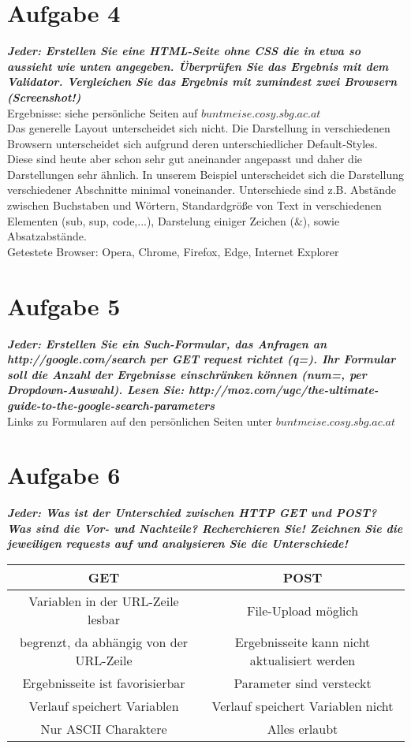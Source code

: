 \documentclass[12pt, a4paper]{report}
\begin{document}
\section*{Aufgabe 4}
\textbf{\textit{Jeder: Erstellen Sie eine HTML-Seite ohne CSS die in etwa so aussieht wie unten angegeben.
Überprüfen Sie das Ergebnis mit dem Validator. Vergleichen Sie das Ergebnis
mit zumindest zwei Browsern (Screenshot!)}}\\
Ergebnisse: siehe persönliche Seiten auf $buntmeise.cosy.sbg.ac.at$\\
Das generelle Layout unterscheidet sich nicht. Die Darstellung in verschiedenen Browsern unterscheidet sich aufgrund deren
unterschiedlicher Default-Styles. Diese sind heute aber schon sehr gut aneinander angepasst und daher die Darstellungen sehr ähnlich. In unserem Beispiel unterscheidet sich die Darstellung verschiedener Abschnitte minimal voneinander. Unterschiede sind z.B. Abstände zwischen Buchstaben und Wörtern, Standardgröße von Text in verschiedenen Elementen (sub, sup, code,...), Darstelung einiger Zeichen (\&), sowie Absatzabstände.\\
Getestete Browser: Opera, Chrome, Firefox, Edge, Internet Explorer



\section*{Aufgabe 5}
\textbf{\textit{Jeder: Erstellen Sie ein Such-Formular, das Anfragen an http://google.com/search
per GET request richtet (q=). Ihr Formular soll die Anzahl der Ergebnisse einschränken
können (num=, per Dropdown-Auswahl).
Lesen Sie: http://moz.com/ugc/the-ultimate-guide-to-the-google-search-parameters}}\\
Links zu Formularen auf den persönlichen Seiten unter $buntmeise.cosy.sbg.ac.at$

\section*{Aufgabe 6}
\textbf{\textit{Jeder: Was ist der Unterschied zwischen HTTP GET und POST? Was sind die Vor- und
Nachteile? Recherchieren Sie! Zeichnen Sie die jeweiligen requests auf und analysieren
Sie die Unterschiede!}}\\
\begin{tabular}{c|c}
	GET & POST \\ \hline
	Variablen in der URL-Zeile lesbar & File-Upload möglich \\ \hline
	begrenzt, da abhängig von der URL-Zeile & Ergebnisseite kann nicht aktualisiert werden\\ \hline
	Ergebnisseite ist favorisierbar & Parameter sind versteckt \\ \hline
	Verlauf speichert Variablen & Verlauf speichert Variablen nicht \\ \hline
	Nur ASCII Charaktere & Alles erlaubt \\ \hline
\end{tabular}
\end{document}
